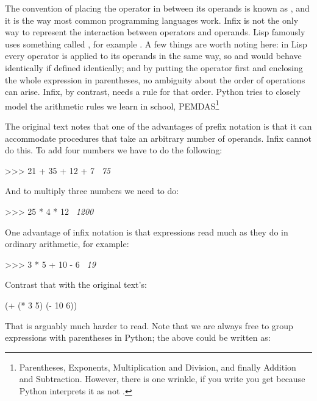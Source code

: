 The convention of placing the operator in between its operands is known as
, and it is the way most common programming languages
work.  Infix is not the only way to represent the interaction between
operators and operands.  Lisp famously uses something called , for example . A few things are worth noting here:
in Lisp every operator is applied to its operands in the same way, so \code{-}
and  would behave identically if defined identically; and by putting
the operator first and enclosing the whole expression in parentheses, no
ambiguity about the order of operations can arise. Infix, by contrast, needs a
rule for that order.  Python tries to closely model the
arithmetic rules we learn in school, PEMDAS\footnote{Parentheses, Exponents,
Multiplication and Division, and finally Addition and Subtraction. However,
there is one wrinkle, if you write  you get  because
Python interprets it as  not .}

The original text notes that one of the advantages of prefix notation is that it
can accommodate procedures that take an arbitrary number of operands. Infix
cannot do this.  To add four numbers we have to do the following:

\begin{codeBlock}
>>> 21 + 35 + 12 + 7
~\textit{75}~
\end{codeBlock}

\noindent
And to multiply three numbers we need to do:

\begin{codeBlock}
>>> 25 * 4 * 12
~\textit{1200}~
\end{codeBlock}

\noindent
One advantage of infix notation is that expressions read much as they do in
ordinary arithmetic, for example:

\begin{codeBlock}
>>> 3 * 5 + 10 - 6
~\textit{19}~
\end{codeBlock}

\noindent
Contrast that with the original text's:

\begin{syntaxForm}
(+ (* 3 5) (- 10 6))
\end{syntaxForm}

\noindent
That is arguably much harder to read. Note that we are always free to group
expressions with parentheses in Python; the above could be written as:

